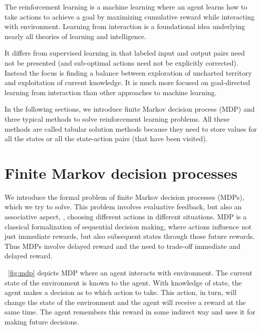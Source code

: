 \def\balg#1\ealg{
\begin{center}%
%
\end{center}%
}

The reinforcement learning is a machine learning where an agent learns how to take actions to achieve a goal
by maximizing cumulative reward while interacting with environment.
Learning from interaction is a foundational idea underlying nearly all theories of learning and intelligence.

It differs from supervised learning in that labeled input and output pairs need not be presented
(and sub-optimal actions need not be explicitly corrected).
Instead the focus is finding a balance between exploration of uncharted territory and exploitation of current knowledge.
It is much more focused on goal-directed learning from interaction than other approaches to machine learning.

In the following sections,
we introduce finite Markov decision process (MDP)
and three typical methods to solve reinforcement learning problems.
All these methods are called tabular solution methods
because they need to store values for all the states or all the state-action pairs (that have been visited).



\section{Finite Markov decision processes}

We introduce the formal problem of finite Markov decision processes (MDPs),
which we try to solve.
This problem involves evaluative feedback,
but also an associative aspect, \ie, choosing different actions in different situations.
MDP is a classical formalization of sequential decision making,
where actions influence not just immediate rewards,
but also subsequent states through those future rewards.
Thus MDPs involve delayed reward and the need to trade-off immediate and delayed reward.

\figurename~\ref{fig:mdp} depicts MDP where an agent interacts with environment.
The current state of the environment is known to the agent.
With knowledge of state, the agent makes a decision as to which action to take.
This action, in turn, will change the state of the environment and the agent will receive
a reward at the same time.
The agent remembers this reward in some indirect way and uses it for making future decisions.

